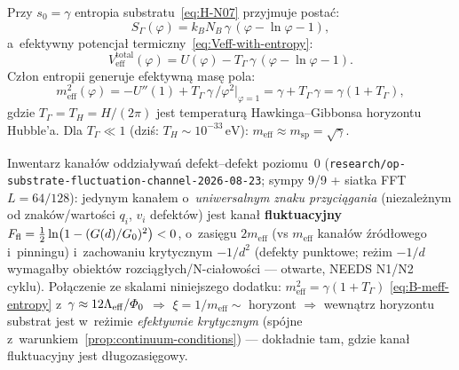 \begin{corollary}\label{cor:entropy-potential}
Przy $s_0 = \gamma$ entropia substratu~\eqref{eq:H-N07}
przyjmuje posta\'c:
\begin{equation}\label{eq:B-entropy-explicit}
  S_\Gamma(\varphi) = k_B N_B\,\gamma\,(\varphi - \ln\varphi - 1),
\end{equation}
a~efektywny potencja\l{} termiczny~\eqref{eq:Veff-with-entropy}:
\begin{equation}\label{eq:B-Veff-total}
  V_{\mathrm{eff}}^{\mathrm{total}}(\varphi)
  = U(\varphi) - T_\Gamma\,\gamma\,(\varphi - \ln\varphi - 1).
\end{equation}
Cz\l{}on entropii generuje efektywn\k{a} mas\k{e} pola:
\begin{equation}\label{eq:B-meff-entropy}
  m_{\mathrm{eff}}^2(\varphi)
  = -U''(1) + T_\Gamma\,\gamma\,/\varphi^2\big|_{\varphi=1}
  = \gamma + T_\Gamma\,\gamma
  = \gamma(1 + T_\Gamma),
\end{equation}
gdzie $T_\Gamma = T_H = H/(2\pi)$ jest temperatur\k{a}
Hawkinga--Gibbonsa horyzontu Hubble'a.
Dla $T_\Gamma \ll 1$ (dzi\'s: $T_H \sim 10^{-33}\,\mathrm{eV}$):
$m_{\mathrm{eff}} \approx m_{\mathrm{sp}} = \sqrt{\gamma}$.
\end{corollary}

\begin{remark}\label{rem:fluctuation-channel-bridge}
Inwentarz kana\l{}\'ow oddzia\l{}ywa\'n defekt--defekt poziomu~0
(\texttt{research/op-substrate-fluctuation-channel-2026-08-23};
sympy 9/9 + siatka FFT $L=64/128$): jedynym kana\l{}em
o~\emph{uniwersalnym znaku przyci\k{a}gania} (niezale\.znym od
znak\'ow/warto\'sci $q_i$, $v_i$ defekt\'ow) jest kana\l{}
\textbf{fluktuacyjny}
$F_{\rm fl}=\tfrac12\ln\bigl(1-(G(d)/G_0)^2\bigr)<0$,
o~zasi\k{e}gu $2m_{\mathrm{eff}}$ (vs $m_{\mathrm{eff}}$ kana\l{}\'ow
\'zr\'od\l{}owego i~pinningu) i~zachowaniu krytycznym $-1/d^2$
(defekty punktowe; re\.zim $-1/d$ wymaga\l{}by obiekt\'ow
rozci\k{a}g\l{}ych/N-cia\l{}owo\'sci --- otwarte, NEEDS N1/N2 cyklu).
Po\l{}\k{a}czenie ze skalami niniejszego dodatku:
$m_{\mathrm{eff}}^2=\gamma(1+T_\Gamma)$
\eqref{eq:B-meff-entropy} z~$\gamma\approx12\Lambda_{\mathrm{eff}}/\varPhi_0$
$\Longrightarrow$ $\xi=1/m_{\mathrm{eff}}\sim$ horyzont
$\Longrightarrow$ wewn\k{a}trz horyzontu substrat jest
w~re\.zimie \emph{efektywnie krytycznym}
(sp\'ojne z~warunkiem~\ref{prop:continuum-conditions}) ---
dok\l{}adnie tam, gdzie kana\l{} fluktuacyjny jest
d\l{}ugozasi\k{e}gowy.
\end{remark}

